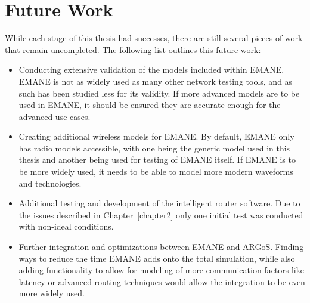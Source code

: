 \section{Future Work}
While each stage of this thesis had successes, there are still several pieces of work that remain uncompleted. The following list outlines this future work:
\begin{itemize}
    \item Conducting extensive validation of the models included within EMANE. EMANE is not as widely used as many other network testing tools, and as such has been studied less for its validity. If more advanced models are to be used in EMANE, it should be ensured they are accurate enough for the advanced use cases.
    \item Creating additional wireless models for EMANE. By default, EMANE only has radio models accessible, with one being the generic model used in this thesis and another being used for testing of EMANE itself. If EMANE is to be more widely used, it needs to be able to model more modern waveforms and technologies.
    \item Additional testing and development of the intelligent router software. Due to the issues described in Chapter~\ref{chapter2} only one initial test was conducted with non-ideal conditions.
    \item Further integration and optimizations between EMANE and ARGoS. Finding ways to reduce the time EMANE adds onto the total simulation, while also adding functionality to allow for modeling of more communication factors like latency or advanced routing techniques would allow the integration to be even more widely used.
\end{itemize}